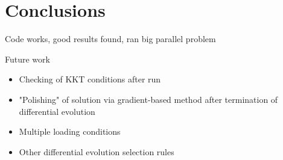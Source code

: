 \documentclass{article}
\begin{document}
\section{Conclusions}
Code works, good results found, ran big parallel problem

Future work
\begin{itemize}
  \item Checking of KKT conditions after run
  \item "Polishing" of solution via gradient-based method after termination of differential evolution
  \item Multiple loading conditions
  \item Other differential evolution selection rules
\end{itemize}

\printbibliography
\end{document}
